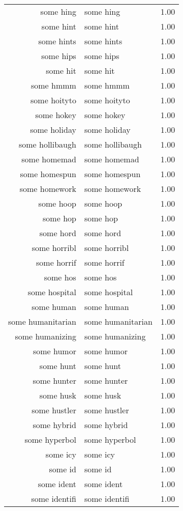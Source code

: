 \begin{table}[ht]
\begin{tabular}{rlr}
  some hing & some hing & 1.00 \\ 
  some hint & some hint & 1.00 \\ 
  some hints & some hints & 1.00 \\ 
  some hips & some hips & 1.00 \\ 
  some hit & some hit & 1.00 \\ 
  some hmmm & some hmmm & 1.00 \\ 
  some hoityto & some hoityto & 1.00 \\ 
  some hokey & some hokey & 1.00 \\ 
  some holiday & some holiday & 1.00 \\ 
  some hollibaugh & some hollibaugh & 1.00 \\ 
  some homemad & some homemad & 1.00 \\ 
  some homespun & some homespun & 1.00 \\ 
  some homework & some homework & 1.00 \\ 
  some hoop & some hoop & 1.00 \\ 
  some hop & some hop & 1.00 \\ 
  some hord & some hord & 1.00 \\ 
  some horribl & some horribl & 1.00 \\ 
  some horrif & some horrif & 1.00 \\ 
  some hos & some hos & 1.00 \\ 
  some hospital & some hospital & 1.00 \\ 
  some human & some human & 1.00 \\ 
  some humanitarian & some humanitarian & 1.00 \\ 
  some humanizing & some humanizing & 1.00 \\ 
  some humor & some humor & 1.00 \\ 
  some hunt & some hunt & 1.00 \\ 
  some hunter & some hunter & 1.00 \\ 
  some husk & some husk & 1.00 \\ 
  some hustler & some hustler & 1.00 \\ 
  some hybrid & some hybrid & 1.00 \\ 
  some hyperbol & some hyperbol & 1.00 \\ 
  some icy & some icy & 1.00 \\ 
  some id & some id & 1.00 \\ 
  some ident & some ident & 1.00 \\ 
  some identifi & some identifi & 1.00 \\ 

\end{tabular}
\end{table}
